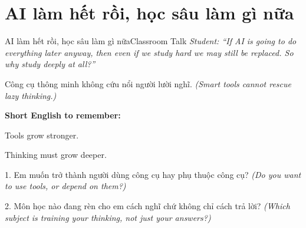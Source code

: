\section{AI làm hết rồi, học sâu làm gì nữa}
\begin{truyen}{AI làm hết rồi, học sâu làm gì nữa}{Classroom Talk}
\textit{Student: ``If AI is going to do everything later anyway, then even if we study hard we may still be replaced. So why study deeply at all?''}\\[4pt]



\end{truyen}

\begin{baihoc}
Công cụ thông minh không cứu nổi người lười nghĩ.
\textit{(Smart tools cannot rescue lazy thinking.)}
\end{baihoc}

\begin{ghinhoanh}
\textbf{Short English to remember:}

Tools grow stronger.

Thinking must grow deeper.
\end{ghinhoanh}

\begin{tuhocnhanh}
1. Em muốn trở thành người dùng công cụ hay phụ thuộc công cụ? \textit{(Do you want to use tools, or depend on them?)}

2. Môn học nào đang rèn cho em cách nghĩ chứ không chỉ cách trả lời? \textit{(Which subject is training your thinking, not just your answers?)}
\end{tuhocnhanh}
\ngancach

